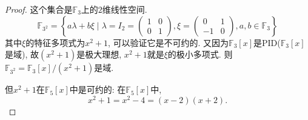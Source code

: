 \begin{proof}
    这个集合是$\mathbb{F}_3$上的$2$维线性空间.
    \[
        \mathbb{F}_{3^2} =
        \left\{
        a\lambda + b\xi \mid
        \lambda = I_2 =
        \begin{pmatrix}
            1 & 0\\
            0 & 1
        \end{pmatrix},
        \xi = 
        \begin{pmatrix}
            0 & 1\\
            -1 & 0
        \end{pmatrix},
        a, b \in \mathbb{F}_3
        \right\}
    \]
    其中$\xi$的特征多项式为$x^2 + 1$, 可以验证它是不可约的. 又因为$\mathbb{F}_3[x]$是PID($\mathbb{F}_3[x]$是域), 故$(x^2 + 1)$是极大理想, $x^2 + 1$就是$\xi$的极小多项式. 则$\mathbb{F}_{3^2} = \mathbb{F}_3[x]/(x^2 + 1)$是域.
    
    但$x^2 + 1$在$\mathbb{F}_5[x]$中是可约的: 在$\mathbb{F}_5[x]$中, 
    \[
        x^2 + 1 = x^2 - 4 = (x - 2)(x + 2).
    \]
\end{proof}